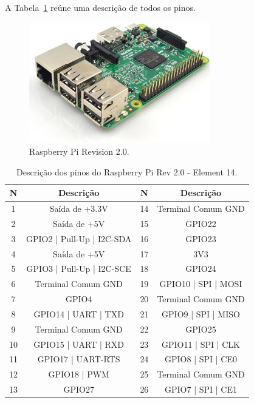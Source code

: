 \documentclass[12pt,a4paper,oneside]{book}
\begin{document}
%
A Tabela~\ref{tab:Raspberry Pinout} reúne uma descrição de todos os pinos.
%
\begin{figure}[!htbp]
    \centering
    \includegraphics[width=0.7\textwidth]{Images/introducao/rasp3b.jpg}
    \caption{Raspberry Pi Revision 2.0.}
    \label{fig:rasp3b.jpg.0}
\end{figure}
%
\begin{table}[!htbp]
    \centering
    \begin{tabular}{|c|c|c|c|} 
         \hline
         \textbf{N} & \textbf{Descrição} & \textbf{N} & \textbf{Descrição} \\ [0.5ex]
         \hline
         1 & Saída de +3.3V & 14 & Terminal Comum GND\\
         \hline
         2 & Saída de +5V & 15 & GPIO22 \\
         \hline
         3 & GPIO2 | Pull-Up | I2C-SDA & 16 & GPIO23 \\ 
         \hline
         4 & Saída de +5V & 17 & 3V3 \\
         \hline
         5 & GPIO3 | Pull-Up | I2C-SCE & 18 & GPIO24 \\
         \hline
         6 & Terminal Comum GND & 19 & GPIO10 | SPI | MOSI \\ 
         \hline
         7 & GPIO4 & 20 & Terminal Comum GND \\ 
         \hline
         8 & GPIO14 | UART | TXD & 21 & GPIO9 | SPI | MISO\\
         \hline
         9 & Terminal Comum GND & 22 & GPIO25\\
         \hline
         10 & GPIO15 | UART | RXD & 23 & GPIO11 | SPI | CLK\\ 
         \hline
         11 & GPIO17 | UART-RTS & 24 & GPIO8 | SPI | CE0\\
         \hline
         12 & GPIO18 | PWM & 25 & Terminal Comum GND\\ 
         \hline
         13 & GPIO27 & 26 & GPIO7 | SPI | CE1\\ 
         \hline
    \end{tabular}
    \caption{Descrição dos pinos do Raspberry Pi Rev 2.0 - Element 14.}
    \label{tab:Raspberry Pinout}
\end{table}
\end{document}
